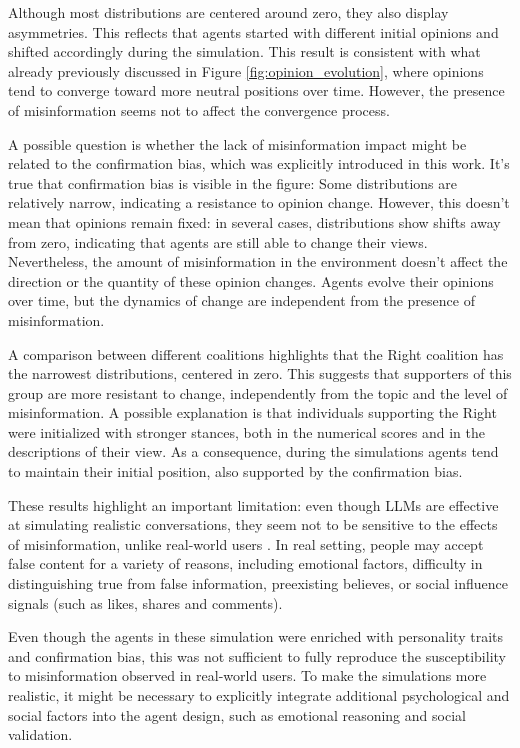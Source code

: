 \medskip
Although most distributions are centered around zero, they also display asymmetries.
This reflects that agents started with different initial opinions and shifted accordingly during the simulation.
This result is consistent with what already previously discussed in Figure \ref{fig:opinion_evolution}, where opinions tend to converge toward more neutral positions over time.
However, the presence of misinformation seems not to affect the convergence process.

\medskip
A possible question is whether the lack of misinformation impact might be related to the confirmation bias, which was explicitly introduced in this work.
It's true that confirmation bias is visible in the figure: Some distributions are relatively narrow, indicating a resistance to opinion change.
However, this doesn't mean that opinions remain fixed: in several cases, distributions show shifts away from zero, indicating that agents are still able to change their views.
Nevertheless, the amount of misinformation in the environment doesn't affect the direction or the quantity of these opinion changes. Agents evolve their opinions over time, but the dynamics of change are independent from the presence of misinformation.

\medskip
A comparison between different coalitions highlights that the Right coalition has the narrowest distributions, centered in zero.
This suggests that supporters of this group are more resistant to change, independently from the topic and the level of misinformation.
A possible explanation is that individuals supporting the Right were initialized with stronger stances, both in the numerical scores and in the descriptions of their view. 
As a consequence, during the simulations agents tend to maintain their initial position, also supported by the confirmation bias.

\medskip
These results highlight an important limitation: even though LLMs are effective at simulating realistic conversations, they seem not to be sensitive to the effects of misinformation, unlike real-world users \cite{aimeur2023fake}.
In real setting, people may accept false content for a variety of reasons, including emotional factors, difficulty in distinguishing true from false information, preexisting believes, or social influence signals (such as likes, shares and comments).

Even though the agents in these simulation were enriched with personality traits and confirmation bias, this was not sufficient to fully reproduce the susceptibility to misinformation observed in real-world users.
To make the simulations more realistic, it might be necessary to explicitly integrate additional psychological and social factors into the agent design, such as emotional reasoning and social validation.


